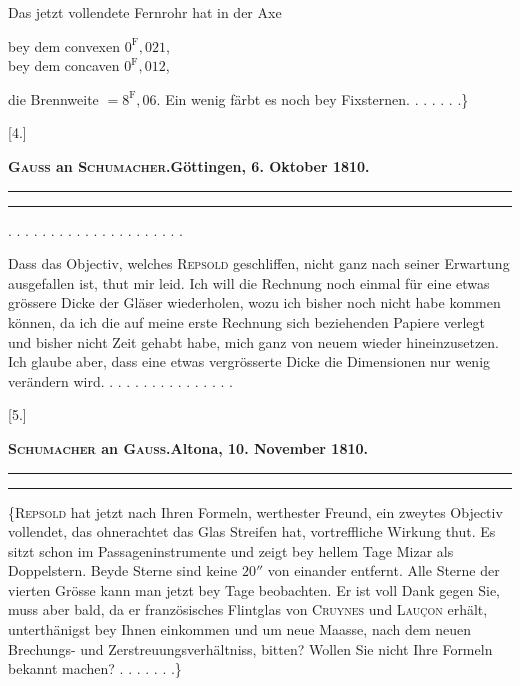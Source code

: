Das jetzt vollendete Fernrohr hat in der Axe
\begin{center}
bey dem convexen $0^{\mathrm F}{,}021$,\\
bey dem concaven $0^{\mathrm F}{,}012$,
\end{center}
\noindent die Brennweite $=8^{\mathrm F}{,}06$. Ein wenig färbt es noch bey Fixsternen. . . . . . .\}
\bigskip\begin{center}
[4.]\par\medskip
\textbf{\textsc{Gauss} an \textsc{Schumacher}.\quad Göttingen, 6. Oktober 1810.}\par\medskip
\rule{.75\linewidth}{.4pt}\par
[Briefwechsel zwischen \textsc{Gauss} und \textsc{Schumacher} I, S. 54.]\par
\rule{.75\linewidth}{.4pt}
\end{center}
\noindent . . . . . . . . . . . . . . . . . . . . .\par
\noindent\hspace*{\parindent}Dass das Objectiv, welches \textsc{Repsold} geschliffen, nicht ganz nach seiner Erwartung ausgefallen ist, thut mir leid. Ich will die Rechnung noch einmal für eine etwas grössere Dicke der Gläser wiederholen, wozu ich bisher noch nicht habe kommen können, da ich die auf meine erste Rechnung sich beziehenden Papiere verlegt und bisher nicht Zeit gehabt habe, mich ganz von neuem wieder hineinzusetzen. Ich glaube aber, dass eine etwas vergrösserte Dicke die Dimensionen nur wenig verändern wird. . . . . . . . . . . . . . . .
\bigskip\begin{center}
[5.]\par\medskip
\textbf{\textsc{Schumacher} an \textsc{Gauss}.\quad Altona, 10. November 1810.}\par\medskip
\rule{.75\linewidth}{.4pt}\par
[Briefwechsel zwischen \textsc{Gauss} und \textsc{Schumacher} I, S. 58.]\par
\rule{.75\linewidth}{.4pt}
\end{center}
\noindent\hspace*{\parindent}\{\textsc{Repsold} hat jetzt nach Ihren Formeln, werthester Freund, ein zweytes Objectiv vollendet, das ohnerachtet das Glas Streifen hat, vortreffliche
\clearpage{}
\noindent Wirkung thut. Es sitzt schon im Passageninstrumente und zeigt bey hellem Tage Mizar als Doppelstern. Beyde Sterne sind keine $20''$ von einander entfernt. Alle Sterne der vierten Grösse kann man jetzt bey Tage beobachten. Er ist voll Dank gegen Sie, muss aber bald, da er französisches Flintglas von \textsc{Cruynes} und \textsc{Lauçon} erhält, unterthänigst bey Ihnen einkommen und um neue Maasse, nach dem neuen Brechungs- und Zerstreuungsverhältniss, bitten? Wollen Sie nicht Ihre Formeln bekannt machen? . . . . . . .\}
